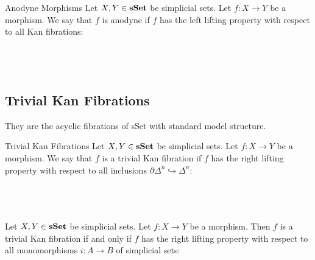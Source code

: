 \documentclass[a4paper]{article}
\begin{document}
\begin{defn}{Anodyne Morphisms}{} Let $X,Y\in\bold{sSet}$ be simplicial sets. Let $f:X\to Y$ be a morphism. We say that $f$ is anodyne if $f$ has the left lifting property with respect to all Kan fibrations: \\~\\
\\~\\
\end{defn}

\subsection{Trivial Kan Fibrations}
They are the acyclic fibrations of sSet with standard model structure. 

\begin{defn}{Trivial Kan Fibrations}{} Let $X,Y\in\bold{sSet}$ be simplicial sets. Let $f:X\to Y$ be a morphism. We say that $f$ is a trivial Kan fibration if $f$ has the right lifting property with respect to all inclusions $\partial\Delta^n\hookrightarrow\Delta^n$: \\~\\
\\~\\
\end{defn}

\begin{prp}{}{} Let $X,Y\in\bold{sSet}$ be simplicial sets. Let $f:X\to Y$ be a morphism. Then $f$ is a trivial Kan fibration if and only if $f$ has the right lifting property with respect to all monomorphisms $i:A\to B$ of simplicial sets: \\~\\
\\~\\
\end{prp}
\end{document}
